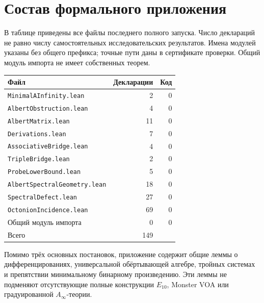 \documentclass[11pt,a4paper]{article}
\numberwithin{equation}{section}
\theoremstyle{definition}
\theoremstyle{remark}
\begin{document}
\section{Состав формального приложения}\label{app:files}
В таблице приведены все файлы последнего полного запуска.
Число деклараций не равно числу самостоятельных исследовательских
результатов. Имена модулей указаны без общего префикса; точные пути
даны в сертификате проверки. Общий модуль импорта не имеет
собственных теорем.
\begin{center}\small
\begin{tabular}{@{}p{}rr@{}}
\toprule
Файл & Декларации & Код\\
\midrule
\nolinkurl{MinimalAInfinity.lean} & 2 & 0\\
\nolinkurl{AlbertObstruction.lean} & 4 & 0\\
\nolinkurl{AlbertMatrix.lean} & 11 & 0\\
\nolinkurl{Derivations.lean} & 7 & 0\\
\nolinkurl{AssociativeBridge.lean} & 4 & 0\\
\nolinkurl{TripleBridge.lean} & 2 & 0\\
\nolinkurl{ProbeLowerBound.lean} & 5 & 0\\
\nolinkurl{AlbertSpectralGeometry.lean} & 18 & 0\\
\nolinkurl{SpectralDefect.lean} & 27 & 0\\
\nolinkurl{OctonionIncidence.lean} & 69 & 0\\
Общий модуль импорта & 0 & 0\\
\midrule
Всего & 149 & \\
\bottomrule
\end{tabular}
\end{center}

Помимо трёх основных постановок, приложение содержит общие леммы
о дифференцированиях, универсальной обёртывающей алгебре, тройных
системах и препятствии минимальному бинарному произведению.
Эти леммы не подменяют отсутствующие полные конструкции $E_{10}$,
Monster VOA или градуированной $A_\infty$-теории.
\end{document}
